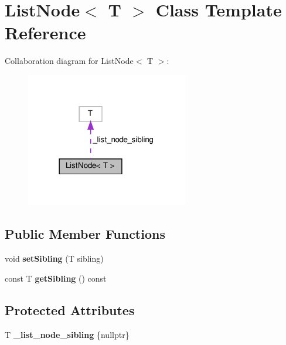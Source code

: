 \hypertarget{classListNode}{}\section{List\+Node$<$ T $>$ Class Template Reference}
\label{classListNode}


Collaboration diagram for List\+Node$<$ T $>$\+:\nopagebreak
\begin{figure}[H]
\begin{center}
\leavevmode
\includegraphics[width=201pt]{d1/da3/classListNode__coll__graph}
\end{center}
\end{figure}
\subsection*{Public Member Functions}
\begin{DoxyCompactItemize}
\item 
\mbox{\label{classListNode_a1d1198777d13c405d0a1b696dd735db4}} 
void {\bfseries set\+Sibling} (T sibling)
\item 
\mbox{\label{classListNode_a55a754dc43f33886f9c27c9bc20138be}} 
const T {\bfseries get\+Sibling} () const
\end{DoxyCompactItemize}
\subsection*{Protected Attributes}
\begin{DoxyCompactItemize}
\item 
\mbox{\label{classListNode_aef40d1d685d22dd9c075bfe77c4e27cf}} 
T {\bfseries \+\_\+list\+\_\+node\+\_\+sibling} \{nullptr\}
\end{DoxyCompactItemize}


